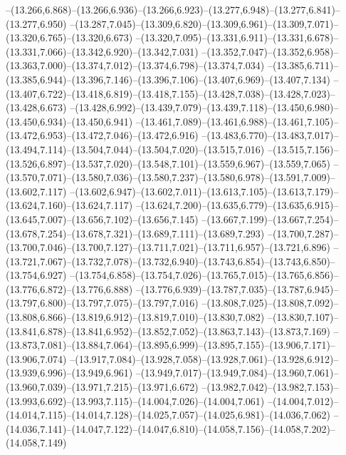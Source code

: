   --(13.266,6.868)--(13.266,6.936)--(13.266,6.923)--(13.277,6.948)--(13.277,6.841)--(13.277,6.950)%
  --(13.287,7.045)--(13.309,6.820)--(13.309,6.961)--(13.309,7.071)--(13.320,6.765)--(13.320,6.673)%
  --(13.320,7.095)--(13.331,6.911)--(13.331,6.678)--(13.331,7.066)--(13.342,6.920)--(13.342,7.031)%
  --(13.352,7.047)--(13.352,6.958)--(13.363,7.000)--(13.374,7.012)--(13.374,6.798)--(13.374,7.034)%
  --(13.385,6.711)--(13.385,6.944)--(13.396,7.146)--(13.396,7.106)--(13.407,6.969)--(13.407,7.134)%
  --(13.407,6.722)--(13.418,6.819)--(13.418,7.155)--(13.428,7.038)--(13.428,7.023)--(13.428,6.673)%
  --(13.428,6.992)--(13.439,7.079)--(13.439,7.118)--(13.450,6.980)--(13.450,6.934)--(13.450,6.941)%
  --(13.461,7.089)--(13.461,6.988)--(13.461,7.105)--(13.472,6.953)--(13.472,7.046)--(13.472,6.916)%
  --(13.483,6.770)--(13.483,7.017)--(13.494,7.114)--(13.504,7.044)--(13.504,7.020)--(13.515,7.016)%
  --(13.515,7.156)--(13.526,6.897)--(13.537,7.020)--(13.548,7.101)--(13.559,6.967)--(13.559,7.065)%
  --(13.570,7.071)--(13.580,7.036)--(13.580,7.237)--(13.580,6.978)--(13.591,7.009)--(13.602,7.117)%
  --(13.602,6.947)--(13.602,7.011)--(13.613,7.105)--(13.613,7.179)--(13.624,7.160)--(13.624,7.117)%
  --(13.624,7.200)--(13.635,6.779)--(13.635,6.915)--(13.645,7.007)--(13.656,7.102)--(13.656,7.145)%
  --(13.667,7.199)--(13.667,7.254)--(13.678,7.254)--(13.678,7.321)--(13.689,7.111)--(13.689,7.293)%
  --(13.700,7.287)--(13.700,7.046)--(13.700,7.127)--(13.711,7.021)--(13.711,6.957)--(13.721,6.896)%
  --(13.721,7.067)--(13.732,7.078)--(13.732,6.940)--(13.743,6.854)--(13.743,6.850)--(13.754,6.927)%
  --(13.754,6.858)--(13.754,7.026)--(13.765,7.015)--(13.765,6.856)--(13.776,6.872)--(13.776,6.888)%
  --(13.776,6.939)--(13.787,7.035)--(13.787,6.945)--(13.797,6.800)--(13.797,7.075)--(13.797,7.016)%
  --(13.808,7.025)--(13.808,7.092)--(13.808,6.866)--(13.819,6.912)--(13.819,7.010)--(13.830,7.082)%
  --(13.830,7.107)--(13.841,6.878)--(13.841,6.952)--(13.852,7.052)--(13.863,7.143)--(13.873,7.169)%
  --(13.873,7.081)--(13.884,7.064)--(13.895,6.999)--(13.895,7.155)--(13.906,7.171)--(13.906,7.074)%
  --(13.917,7.084)--(13.928,7.058)--(13.928,7.061)--(13.928,6.912)--(13.939,6.996)--(13.949,6.961)%
  --(13.949,7.017)--(13.949,7.084)--(13.960,7.061)--(13.960,7.039)--(13.971,7.215)--(13.971,6.672)%
  --(13.982,7.042)--(13.982,7.153)--(13.993,6.692)--(13.993,7.115)--(14.004,7.026)--(14.004,7.061)%
  --(14.004,7.012)--(14.014,7.115)--(14.014,7.128)--(14.025,7.057)--(14.025,6.981)--(14.036,7.062)%
  --(14.036,7.141)--(14.047,7.122)--(14.047,6.810)--(14.058,7.156)--(14.058,7.202)--(14.058,7.149)%
